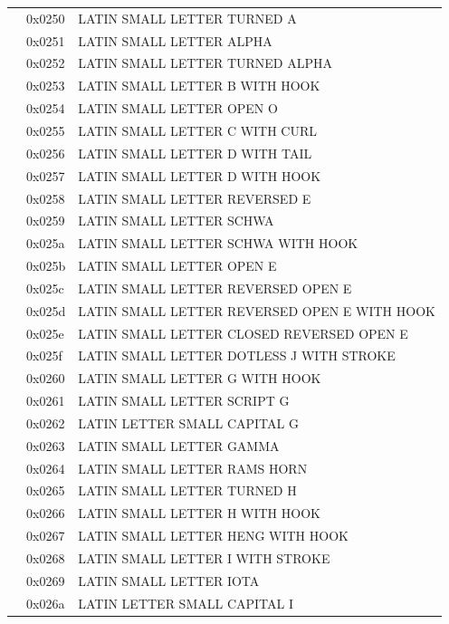 \documentclass[12pt, twoside]{article}
\begin{document}
\begin{longtable}{L{1.0cm} L{2.0cm} >{\footnotesize}L{10cm}}
&0x0250&LATIN SMALL LETTER TURNED A\\
&0x0251&LATIN SMALL LETTER ALPHA\\
&0x0252&LATIN SMALL LETTER TURNED ALPHA\\
&0x0253&LATIN SMALL LETTER B WITH HOOK\\
&0x0254&LATIN SMALL LETTER OPEN O\\
&0x0255&LATIN SMALL LETTER C WITH CURL\\
&0x0256&LATIN SMALL LETTER D WITH TAIL\\
&0x0257&LATIN SMALL LETTER D WITH HOOK\\
&0x0258&LATIN SMALL LETTER REVERSED E\\
&0x0259&LATIN SMALL LETTER SCHWA\\
&0x025a&LATIN SMALL LETTER SCHWA WITH HOOK\\
&0x025b&LATIN SMALL LETTER OPEN E\\
&0x025c&LATIN SMALL LETTER REVERSED OPEN E\\
&0x025d&LATIN SMALL LETTER REVERSED OPEN E WITH HOOK\\
&0x025e&LATIN SMALL LETTER CLOSED REVERSED OPEN E\\
&0x025f&LATIN SMALL LETTER DOTLESS J WITH STROKE\\
&0x0260&LATIN SMALL LETTER G WITH HOOK\\
&0x0261&LATIN SMALL LETTER SCRIPT G\\
&0x0262&LATIN LETTER SMALL CAPITAL G\\
&0x0263&LATIN SMALL LETTER GAMMA\\
&0x0264&LATIN SMALL LETTER RAMS HORN\\
&0x0265&LATIN SMALL LETTER TURNED H\\
&0x0266&LATIN SMALL LETTER H WITH HOOK\\
&0x0267&LATIN SMALL LETTER HENG WITH HOOK\\
&0x0268&LATIN SMALL LETTER I WITH STROKE\\
&0x0269&LATIN SMALL LETTER IOTA\\
&0x026a&LATIN LETTER SMALL CAPITAL I\\

\end{longtable}
\end{document}
